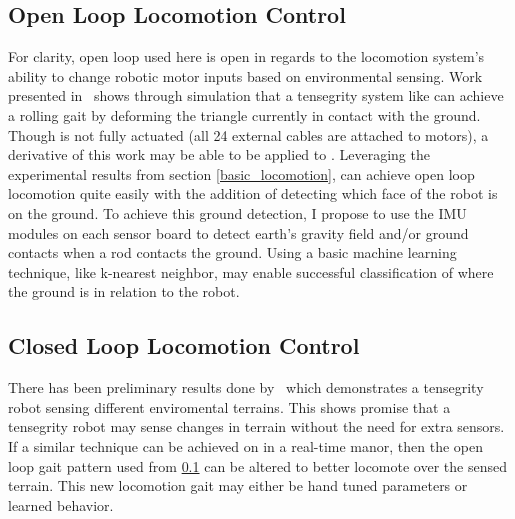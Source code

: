 \subsection{Open Loop Locomotion Control}
\label{open_loop}
For clarity, open loop used here is open in regards to the locomotion system's ability to change robotic motor inputs based on environmental sensing.
Work presented in~\cite{iscen2014flop} shows through simulation that a tensegrity system like \SB{} can achieve a rolling gait by deforming the triangle currently in contact with the ground.
Though \SB{} is not fully actuated (all 24 external cables are attached to motors), a derivative of this work may be able to be applied to \SB{}.
Leveraging the experimental results from section \ref{basic_locomotion}, \SB{} can achieve open loop locomotion quite easily with the addition of detecting which face of the robot is on the ground.
To achieve this ground detection, I propose to use the IMU modules on each sensor board to detect earth's gravity field and/or ground contacts when a rod contacts the ground.
Using a basic machine learning technique, like k-nearest neighbor, may enable successful classification of where the ground is in relation to the robot.

\subsection{Closed Loop Locomotion Control}
There has been preliminary results done by~\cite{burms2015online} which demonstrates a tensegrity robot sensing different enviromental terrains.
This shows promise that a tensegrity robot may sense changes in terrain without the need for extra sensors.
If a similar technique can be achieved on \SB{} in a real-time manor, then the open loop gait pattern used from \ref{open_loop} can be altered to better locomote over the sensed terrain.
This new locomotion gait may either be hand tuned parameters or learned behavior.
